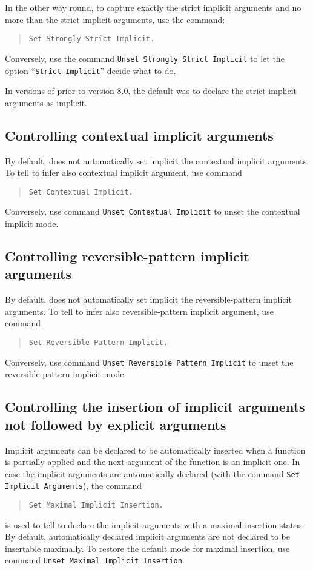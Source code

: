 In the other way round, to capture exactly the strict implicit arguments and no more than the strict implicit arguments, use the command:
\begin{quote}
\tt Set Strongly Strict Implicit.
\end{quote}
Conversely, use the command {\tt Unset Strongly Strict Implicit} to
let the option ``{\tt Strict Implicit}'' decide what to do.

\Rem In versions of {\Coq} prior to version 8.0, the default was to
declare the strict implicit arguments as implicit.

\subsection{Controlling contextual implicit arguments
\label{SetContextualImplicit}}

By default, {\Coq} does not automatically set implicit the contextual
implicit arguments. To tell {\Coq} to infer also contextual implicit
argument, use command  
\begin{quote}
\tt Set Contextual Implicit. 
\end{quote}
Conversely, use command {\tt Unset Contextual Implicit} to
unset the contextual implicit mode.

\subsection{Controlling reversible-pattern implicit arguments
\label{SetReversiblePatternImplicit}}

By default, {\Coq} does not automatically set implicit the reversible-pattern
implicit arguments. To tell {\Coq} to infer also reversible-pattern implicit
argument, use command  
\begin{quote}
\tt Set Reversible Pattern Implicit. 
\end{quote}
Conversely, use command {\tt Unset Reversible Pattern Implicit} to
unset the reversible-pattern implicit mode.

\subsection{Controlling the insertion of implicit arguments not followed by explicit arguments
\label{SetMaximalImplicitInsertion}}

Implicit arguments can be declared to be automatically inserted when a
function is partially applied and the next argument of the function is
an implicit one. In case the implicit arguments are automatically
declared (with the command {\tt Set Implicit Arguments}), the command
\begin{quote}
\tt Set Maximal Implicit Insertion. 
\end{quote}
is used to tell to declare the implicit arguments with a maximal
insertion status. By default, automatically declared implicit
arguments are not declared to be insertable maximally.  To restore the
default mode for maximal insertion, use command {\tt Unset Maximal
Implicit Insertion}.

